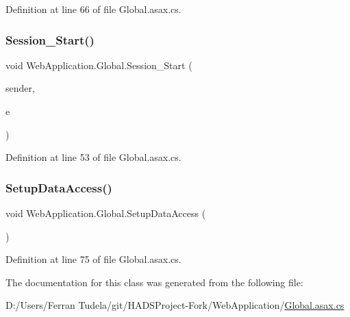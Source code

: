 Definition at line 66 of file Global.\+asax.\+cs.

\mbox{\label{classWebApplication_1_1Global_ab2e5cb6155c6759fc0d1a87d7df1668c}} 
\subsubsection{\texorpdfstring{Session\_Start()}{Session\_Start()}}
{\footnotesize\ttfamily void Web\+Application.\+Global.\+Session\+\_\+\+Start (\begin{DoxyParamCaption}\item[{object}]{sender,  }\item[{Event\+Args}]{e }\end{DoxyParamCaption})\hspace{0.3cm}{\ttfamily [protected]}}



Definition at line 53 of file Global.\+asax.\+cs.

\mbox{\label{classWebApplication_1_1Global_a51f7c694be3dcc6ebd0a1ed4d6b6c337}} 
\subsubsection{\texorpdfstring{SetupDataAccess()}{SetupDataAccess()}}
{\footnotesize\ttfamily void Web\+Application.\+Global.\+Setup\+Data\+Access (\begin{DoxyParamCaption}{ }\end{DoxyParamCaption})\hspace{0.3cm}{\ttfamily [protected]}}



Definition at line 75 of file Global.\+asax.\+cs.



The documentation for this class was generated from the following file\+:\begin{DoxyCompactItemize}
\item 
D\+:/\+Users/\+Ferran Tudela/git/\+H\+A\+D\+S\+Project-\/\+Fork/\+Web\+Application/\mbox{\hyperlink{Global_8asax_8cs}{Global.\+asax.\+cs}}\end{DoxyCompactItemize}
